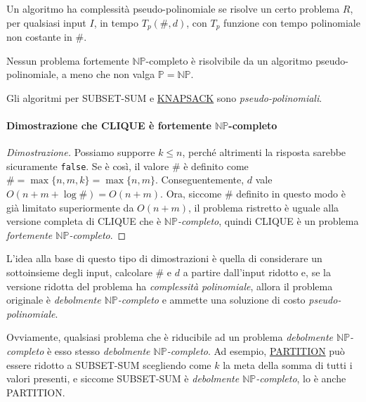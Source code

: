 \begin{definition}
    Un algoritmo ha complessità pseudo-polinomiale se risolve un certo problema
    $R$, per qualsiasi input $I$, in tempo $T_p(\#,d)$, con $T_p$ funzione
    con tempo polinomiale non costante in $\#$.
\end{definition}
\begin{definition}
    Nessun problema fortemente $\mathbb{NP}$-completo è risolvibile da un
    algoritmo pseudo-polinomiale, a meno che non valga $\mathbb{P}=\mathbb{NP}$.
\end{definition}
\begin{note}
    Gli algoritmi per SUBSET-SUM e \hyperref[prob:34]{KNAPSACK} sono
    \emph{pseudo-polinomiali}.
\end{note}

\paragraph{Dimostrazione che CLIQUE è fortemente $\mathbb{NP}$-completo}
\begin{proof}[Dimostrazione]
    Possiamo supporre $k\leq n$, perché altrimenti la risposta sarebbe
    sicuramente \texttt{false}. Se è così, il valore $\#$ è definito come
    $\#=\max\{n,m,k\}=\max\{n,m\}$. Conseguentemente, $d$ vale $O(n+m+\log\#)=
    O(n+m)$. Ora, siccome $\#$ definito in questo modo è già limitato superiormente
    da $O(n+m)$, il problema ristretto è uguale alla versione completa di CLIQUE
    che è \emph{$\mathbb{NP}$-completo}, quindi CLIQUE è un problema
    \emph{fortemente $\mathbb{NP}$-completo}.
\end{proof}

\noindent
L'idea alla base di questo tipo di dimostrazioni è quella di considerare
un sottoinsieme degli input, calcolare $\#$ e $d$ a partire dall'input
ridotto e, se la versione ridotta del problema ha \emph{complessità
polinomiale}, allora il problema originale è \emph{debolmente
$\mathbb{NP}$-completo} e ammette una soluzione di costo \emph{pseudo-polinomiale}.

\begin{note}
    Ovviamente, qualsiasi problema che è riducibile ad un problema
    \emph{debolmente $\mathbb{NP}$-completo} è esso stesso \emph{debolmente
    $\mathbb{NP}$-completo}. Ad esempio, \hyperref[prob:32]{PARTITION} può
    essere ridotto a SUBSET-SUM scegliendo come $k$ la meta della somma di tutti
    i valori presenti, e siccome SUBSET-SUM è \emph{debolmente
    $\mathbb{NP}$-completo}, lo è anche PARTITION.
\end{note}

